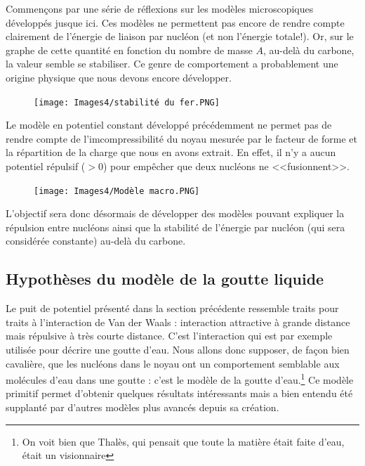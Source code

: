 Commençons par une série de réflexions sur les modèles microscopiques développés jusque ici. Ces modèles ne permettent pas encore de rendre compte clairement de l'énergie de liaison par nucléon (et non l'énergie totale!). Or, sur le graphe de cette quantité en fonction du nombre de masse $A$, au-delà du carbone, la valeur semble se stabiliser. Ce genre de comportement a probablement une origine physique que nous devons encore développer.\\ 
\begin{figure}[H]
    \centering
    \texttt{[image: Images4/stabilité du fer.PNG]}
\end{figure}
Le modèle en potentiel constant développé précédemment ne permet pas de rendre compte de l'imcompressibilité du noyau mesurée par le facteur de forme et la répartition de la charge que nous en avons extrait. En effet, il n'y a aucun potentiel répulsif ($>0$) pour empêcher que deux nucléons ne <<fusionnent>>.\\
\begin{figure}[H]
    \centering
    \texttt{[image: Images4/Modèle macro.PNG]}
\end{figure}
L'objectif sera donc désormais de développer des modèles pouvant expliquer la répulsion entre nucléons ainsi que la stabilité de l'énergie par nucléon (qui sera considérée constante) au-delà du carbone.


\subsection{Hypothèses du modèle de la goutte liquide}


Le puit de potentiel présenté dans la section précédente ressemble traits pour traits à l'interaction de Van der Waals : interaction attractive à grande distance mais répulsive à très courte distance. C'est l'interaction qui est par exemple utilisée pour décrire une goutte d'eau. Nous allons donc supposer, de façon bien cavalière, que les nucléons dans le noyau ont un comportement semblable aux molécules d'eau dans une goutte : c'est le modèle de la goutte d'eau.\footnote{On voit bien que Thalès, qui pensait que toute la matière était faite d'eau, était un visionnaire} Ce modèle primitif permet d'obtenir quelques résultats intéressants mais a bien entendu été supplanté par d'autres modèles plus avancés depuis sa création.\\

